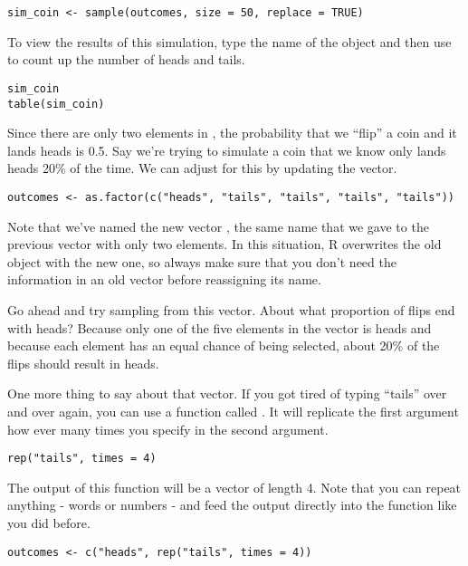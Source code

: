 \documentclass[11pt]{article}
\begin{document}
\begin{lstlisting}
sim_coin <- sample(outcomes, size = 50, replace = TRUE)
\end{lstlisting}

To view the results of this simulation, type the name of the object and then use  to count up the number of heads and tails.

\begin{lstlisting}
sim_coin
table(sim_coin)
\end{lstlisting}

Since there are only two elements in , the probability that we ``flip'' a coin and it lands heads is 0.5.  Say we're trying to simulate a coin that we know only lands heads 20\% of the time.  We can adjust for this by updating the  vector.

\begin{lstlisting}
outcomes <- as.factor(c("heads", "tails", "tails", "tails", "tails"))
\end{lstlisting}


Note that we've named the new vector , the same name that we gave to the previous vector with only two elements. In this situation, R overwrites the old object with the new one, so always make sure that you don't need the information in an old vector before reassigning its name.

Go ahead and try sampling from this vector.  About what proportion of flips end with heads?  Because only one of the five elements in the vector is heads and because each element has an equal chance of being selected, about 20\% of the flips should result in heads.

One more thing to say about that  vector.  If you got tired of typing ``tails'' over and over again, you can use a function called .  It will replicate the first argument how ever many times you specify in the second argument.

\begin{lstlisting}
rep("tails", times = 4)
\end{lstlisting}

The output of this function will be a vector of length 4.  Note that you can repeat anything - words or numbers - and feed the output directly into the  function like you did before.

\begin{lstlisting}
outcomes <- c("heads", rep("tails", times = 4))
\end{lstlisting}
\end{document}

